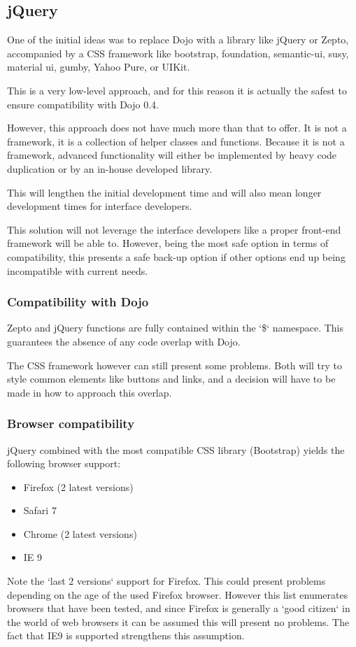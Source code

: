 \subsection{jQuery}
One of the initial ideas was to replace Dojo with a library like jQuery or Zepto,
accompanied by a CSS framework like bootstrap, foundation, semantic-ui, susy,
material ui, gumby, Yahoo Pure, or UIKit.

This is a very low-level approach, and for this reason it is actually the safest
to ensure compatibility with Dojo 0.4.

However, this approach does not have much more than that to offer.
It is not a framework, it is a collection of helper classes and functions.
Because it is not a framework, advanced functionality will either be implemented
by heavy code duplication or by an in-house developed library.

This will lengthen the initial development time and will also mean longer
development times for interface developers.

This solution will not leverage the interface developers like a proper
front-end framework will be able to. However, being the most safe option
in terms of compatibility, this presents a safe back-up option if other options
end up being incompatible with current needs.

\subsubsection{Compatibility with Dojo}
Zepto and jQuery functions are fully contained within the `\$` namespace.
This guarantees the absence of any code overlap with Dojo.

The CSS framework however can still present some problems. Both will try to
style common elements like buttons and links, and a decision will have to be
made in how to approach this overlap.
\subsubsection{Browser compatibility}
jQuery combined with the most compatible CSS library (Bootstrap) yields the
following browser support:
\begin{itemize}[noitemsep]
\item Firefox (2 latest versions)
\item Safari 7
\item Chrome (2 latest versions)
\item IE 9
\end{itemize}
Note the `last 2 versions` support for Firefox. This could present problems
depending on the age of the used Firefox browser. However this list enumerates
browsers that have been tested, and since Firefox is generally a `good citizen`
in the world of web browsers it can be assumed this will present no problems. The
fact that IE9 is supported strengthens this assumption.

